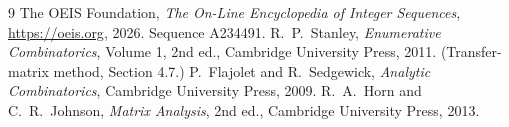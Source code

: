 \documentclass[11pt,a4paper]{article}
\theoremstyle{plain}
\theoremstyle{definition}
\begin{document}
\begin{thebibliography}{9}
 The OEIS Foundation, \emph{The On-Line Encyclopedia of Integer
Sequences}, \url{https://oeis.org}, 2026. Sequence A234491.
 R.~P.~Stanley, \emph{Enumerative Combinatorics}, Volume 1, 2nd ed.,
Cambridge University Press, 2011. (Transfer-matrix method, Section 4.7.)
 P.~Flajolet and R.~Sedgewick, \emph{Analytic Combinatorics}, Cambridge
University Press, 2009.
 R.~A.~Horn and C.~R.~Johnson, \emph{Matrix Analysis}, 2nd ed., Cambridge
University Press, 2013.
\end{thebibliography}
\end{document}

